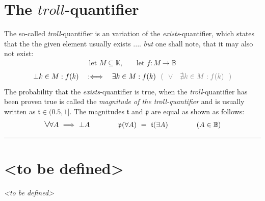 \documentclass[pdftex,12pt,a4paper]{report}
\newcommand{\fpa}{\hbox{\fontsize{13.3pt}{15pt}\selectfont $ \vee $} \hspace{-1.2pt} \forall}
\begin{document}
    \section{The $ \textit{troll} $-quantifier}
    The so-called \emph{troll}-quantifier is an variation of the \emph{exists}-quantifier, which states that the the given element usually exists .... \emph{but} one shall note, that it may also not exist:
    \begin{equation*}
        \begin{aligned}
            \text{let } M \subseteq \mathbb{K} \text{,} \qquad \text{let } f : M \rightarrow \mathbb{B}
        \end{aligned}
    \end{equation*}
    \begin{equation*}
        \begin{aligned}
            \bot k \in M : f(k) \quad :\Longleftrightarrow \quad \exists k \in M : f(k) \textcolor{gray}{\ \ ( \ \ \vee \ \ \ \nexists k \in M : f(k) \ \ )}
        \end{aligned}
    \end{equation*}
    The probability that the \emph{exists}-quantifier is true, when the \emph{troll}-quantifier has been proven true is called the \textit{magnitude of the troll-quantifier} and is usually written as $ \mathfrak{t} \in (0.5,1] $. The magnitudes $ \mathfrak{t} $ and  $ \mathfrak{p} $ are equal as shown as follows:
    \begin{equation*}
        \begin{aligned}
            \fpa A \ \Longrightarrow \ \bot A
            \qquad\qquad
            \mathfrak{p}(\forall A) \ =\ \mathfrak{t}(\exists A)
            \qquad\qquad
            (A \in \mathbb{B})
        \end{aligned}
    \end{equation*}
    \vspace{5mm} \hrule
    \section{<to be defined>}
    \textsl{<to be defined>}
\end{document}

